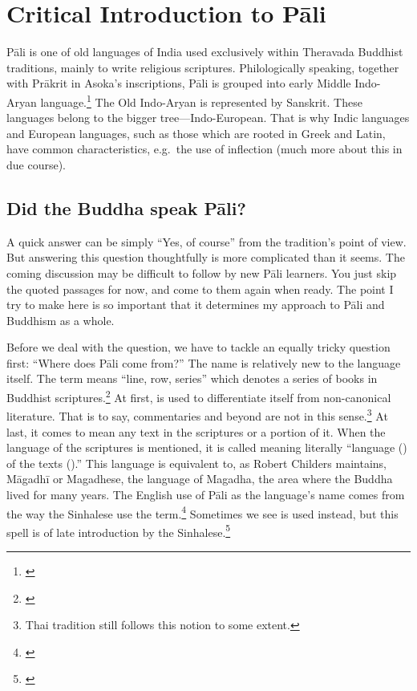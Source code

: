 \chapter{Critical Introduction to P\=ali}\label{chap:intro}

P\=ali is one of old languages of India used exclusively within Theravada Buddhist traditions, mainly to write religious scriptures. Philologically speaking, together with Pr\=akrit in Asoka's inscriptions, P\=ali is grouped into early Middle Indo-Aryan language.\footnote{\citealp[p.~14]{cardonajain:intro}} The Old Indo-Aryan is represented by Sanskrit. These languages belong to the bigger tree---Indo-European. That is why Indic languages and European languages, such as those which are rooted in Greek and Latin, have common characteristics, e.g.\ the use of inflection (much more about this in due course).

{}
\section*{Did the Buddha speak P\=ali?}
A quick answer can be simply ``Yes, of course'' from the tradition's point of view. But answering this question thoughtfully is more complicated than it seems. The coming discussion may be difficult to follow by new P\=ali learners. You just skip the quoted passages for now, and come to them again when ready. The point I try to make here is so important that it determines my approach to P\=ali and Buddhism as a whole.

Before we deal with the question, we have to tackle an equally tricky question first: ``Where does P\=ali come from?'' The name is relatively new to the language itself. The term  means ``line, row, series'' which denotes a series of books in Buddhist scriptures.\footnote{\citealp[p.~vii]{childers:dict}} At first,  is used to differentiate itself from non-canonical literature. That is to say, commentaries and beyond are not  in this sense.\footnote{Thai tradition still follows this notion to some extent.} At last, it comes to mean any text in the scriptures or a portion of it. When the language of the scriptures is mentioned, it is called  meaning literally ``language () of the texts ().'' This language is equivalent to, as Robert Childers maintains, M\=agadh\=i or Magadhese, the language of Magadha, the area where the Buddha lived for many years. The English use of P\=ali as the language's name comes from the way the Sinhalese use the term.\footnote{\citealp[p.~vii]{childers:dict}} Sometimes we see  is used instead, but this spell is of late introduction by the Sinhalese.\footnote{\citealp[p.~322]{childers:dict}}


